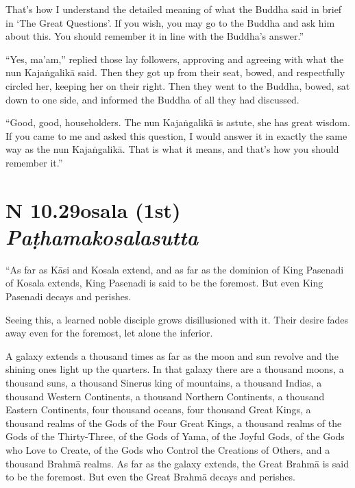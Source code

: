 \documentclass[12pt,openany]{book}%
\newcommand*{\suttatitleacronym}[1]{\smaller[2]{#1}\vspace*{.3em}}
\newcommand*{\suttatitletranslation}[1]{\linebreak{#1}}
\newcommand*{\suttatitleroot}[1]{\linebreak\smaller[2]\itshape{#1}}
\newcommand*{\tocacronym}[1]{\hspace*{-3.3em}{#1}\quad}
\newcommand*{\toctranslation}[1]{#1}
\newcommand*{\tocroot}[1]{(\textit{#1})}
\begin{document}
That’s how I understand the detailed meaning of what the Buddha said in brief in ‘The Great Questions’. If you wish, you may go to the Buddha and ask him about this. You should remember it in line with the Buddha’s answer.” 

“Yes, ma’am,” replied those lay followers, approving and agreeing with what the nun \textsanskrit{Kajaṅgalikā} said. Then they got up from their seat, bowed, and respectfully circled her, keeping her on their right. Then they went to the Buddha, bowed, sat down to one side, and informed the Buddha of all they had discussed. 

“Good, good, householders. The nun \textsanskrit{Kajaṅgalikā} is astute, she has great wisdom. If you came to me and asked this question, I would answer it in exactly the same way as the nun \textsanskrit{Kajaṅgalikā}. That is what it means, and that’s how you should remember it.” 

%
\section*{{\suttatitleacronym AN 10.29}{\suttatitletranslation Kosala (1st) }{\suttatitleroot Paṭhamakosalasutta}}
\addcontentsline{toc}{section}{\tocacronym{AN 10.29} \toctranslation{Kosala (1st) } \tocroot{Paṭhamakosalasutta}}

“As far as \textsanskrit{Kāsi} and Kosala extend, and as far as the dominion of King Pasenadi of Kosala extends, King Pasenadi is said to be the foremost. But even King Pasenadi decays and perishes. 

Seeing this, a learned noble disciple grows disillusioned with it. Their desire fades away even for the foremost, let alone the inferior. 

A galaxy extends a thousand times as far as the moon and sun revolve and the shining ones light up the quarters. In that galaxy there are a thousand moons, a thousand suns, a thousand Sinerus king of mountains, a thousand Indias, a thousand Western Continents, a thousand Northern Continents, a thousand Eastern Continents, four thousand oceans, four thousand Great Kings, a thousand realms of the Gods of the Four Great Kings, a thousand realms of the Gods of the Thirty-Three, of the Gods of Yama, of the Joyful Gods, of the Gods who Love to Create, of the Gods who Control the Creations of Others, and a thousand \textsanskrit{Brahmā} realms. As far as the galaxy extends, the Great \textsanskrit{Brahmā} is said to be the foremost. But even the Great \textsanskrit{Brahmā} decays and perishes. 
\end{document}

